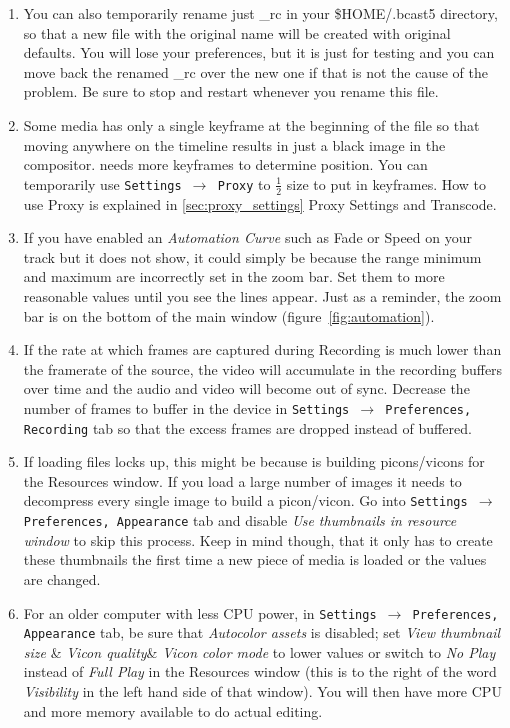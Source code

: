 \begin{enumerate}
        \item You can also temporarily rename just \CGG{}\_rc in your \$HOME/.bcast5 directory, so
that a new file with the original name will be created with original defaults.  You will lose your preferences,
but it is just for testing and you can move back the renamed \CGG{}\_rc over the new one if that is not the
cause of the problem.  Be sure to stop and restart \CGG{} whenever you rename this file.
	\item Some media has only a single keyframe at the beginning of the file so that moving anywhere on the timeline results in just a black image in the compositor. \CGG{} needs more keyframes to determine position. You can temporarily use \texttt{Settings $\rightarrow$ Proxy} to $\frac{1}{2}$ size to put in keyframes. How to use Proxy is explained in \ref{sec:proxy_settings} {Proxy Settings and Transcode}.
        \item If you have enabled an \textit{Automation Curve} such as Fade or Speed on your track but it
does not show, it could simply be because the range minimum and maximum are incorrectly set in the zoom bar.
Set them to more reasonable values until you see the lines appear. Just as a reminder, the zoom bar is on the
bottom of the main window (figure~\ref{fig:automation}). 
 	\item If the rate at which frames are captured during Recording is much lower than the framerate of the source, the video will accumulate in the recording buffers over time and the audio and video will become out of sync. Decrease the number of frames to buffer in the device in \texttt{Settings $\rightarrow $ Preferences, Recording} tab so that the excess frames are dropped instead of buffered.
	\item If loading files locks up, this might be because \CGG{} is building picons/vicons for the Resources window. If you load a large number of images it needs to decompress every single image to build a picon/vicon. Go into \texttt{Settings $\rightarrow$ Preferences, Appearance} tab and disable \textit{Use thumbnails in resource window} to skip this process. Keep in mind though, that it only has to create these thumbnails the first time a new piece of media is loaded or the values are changed.
	\item For an older computer with less CPU power, in \texttt{Settings $\rightarrow$ Preferences, Appearance} tab, be sure that \textit{Autocolor assets }is disabled; set \textit{View thumbnail size} \& \textit{Vicon quality}\& \textit{Vicon color mode} to lower values or switch to \textit{No Play} instead of \textit{Full Play} in the Resources window (this is to the right of the word \textit{Visibility} in the left hand side of that window). You will then have more CPU and more memory available to do actual editing.
\end{enumerate}

